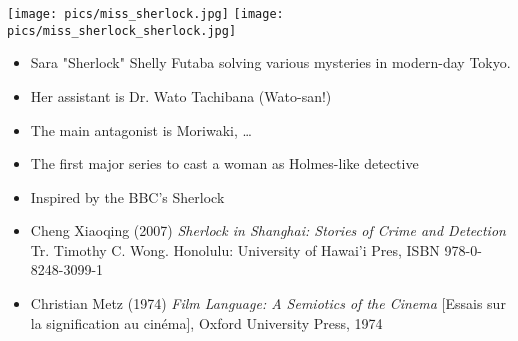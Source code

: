 \documentclass[a4paper,landscape,headrule,footrule,xetex]{foils}
\begin{document}

\texttt{[image: pics/miss\_sherlock.jpg]}
\texttt{[image: pics/miss\_sherlock\_sherlock.jpg]}

\begin{itemize}\addtolength{\itemsep}{-1ex}
\item Sara "Sherlock" Shelly Futaba  solving various mysteries in
  modern-day Tokyo.
\item Her assistant is Dr. Wato Tachibana (Wato-san!)
\item The main antagonist is Moriwaki, \ldots
\item  The first major series to cast a woman as Holmes-like detective
\item Inspired by the BBC's Sherlock
\end{itemize}



  \begin{itemize}
  \item Cheng Xiaoqing (2007) \textit{Sherlock in Shanghai: Stories of
      Crime and Detection} Tr. Timothy C. Wong. Honolulu: University
    of Hawai’i Pres,  ISBN 978-0-8248-3099-1 
  \item  Christian Metz (1974) \textit{Film Language: A Semiotics of
      the Cinema} [Essais sur la signification au cinéma], Oxford
    University Press, 1974
  \end{itemize}
\end{document}
